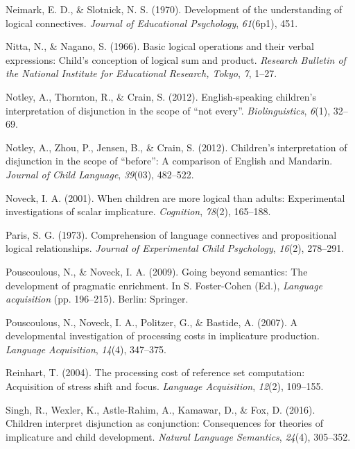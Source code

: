 \documentclass[floatsintext,man]{apa6}
\theoremstyle{definition}
\theoremstyle{definition}
\theoremstyle{definition}
\theoremstyle{remark}
\begin{document}
\hypertarget{ref-neimarkSlotnick1970}{}
Neimark, E. D., \& Slotnick, N. S. (1970). Development of the
understanding of logical connectives. \emph{Journal of Educational
Psychology}, \emph{61}(6p1), 451.

\hypertarget{ref-nitta1966basic}{}
Nitta, N., \& Nagano, S. (1966). Basic logical operations and their
verbal expressions: Child's conception of logical sum and product.
\emph{Research Bulletin of the National Institute for Educational
Research, Tokyo}, \emph{7}, 1--27.

\hypertarget{ref-notley2012notevery}{}
Notley, A., Thornton, R., \& Crain, S. (2012). English-speaking
children's interpretation of disjunction in the scope of ``not every''.
\emph{Biolinguistics}, \emph{6}(1), 32--69.

\hypertarget{ref-notley2012children}{}
Notley, A., Zhou, P., Jensen, B., \& Crain, S. (2012). Children's
interpretation of disjunction in the scope of ``before'': A comparison
of English and Mandarin. \emph{Journal of Child Language},
\emph{39}(03), 482--522.

\hypertarget{ref-noveck2001children}{}
Noveck, I. A. (2001). When children are more logical than adults:
Experimental investigations of scalar implicature. \emph{Cognition},
\emph{78}(2), 165--188.

\hypertarget{ref-paris1973comprehension}{}
Paris, S. G. (1973). Comprehension of language connectives and
propositional logical relationships. \emph{Journal of Experimental Child
Psychology}, \emph{16}(2), 278--291.

\hypertarget{ref-pouscoulous2009going}{}
Pouscoulous, N., \& Noveck, I. A. (2009). Going beyond semantics: The
development of pragmatic enrichment. In S. Foster-Cohen (Ed.),
\emph{Language acquisition} (pp. 196--215). Berlin: Springer.

\hypertarget{ref-pouscoulous2007developmental}{}
Pouscoulous, N., Noveck, I. A., Politzer, G., \& Bastide, A. (2007). A
developmental investigation of processing costs in implicature
production. \emph{Language Acquisition}, \emph{14}(4), 347--375.

\hypertarget{ref-reinhart2004processing}{}
Reinhart, T. (2004). The processing cost of reference set computation:
Acquisition of stress shift and focus. \emph{Language Acquisition},
\emph{12}(2), 109--155.

\hypertarget{ref-Singh2016}{}
Singh, R., Wexler, K., Astle-Rahim, A., Kamawar, D., \& Fox, D. (2016).
Children interpret disjunction as conjunction: Consequences for theories
of implicature and child development. \emph{Natural Language Semantics},
\emph{24}(4), 305--352.
\end{document}
